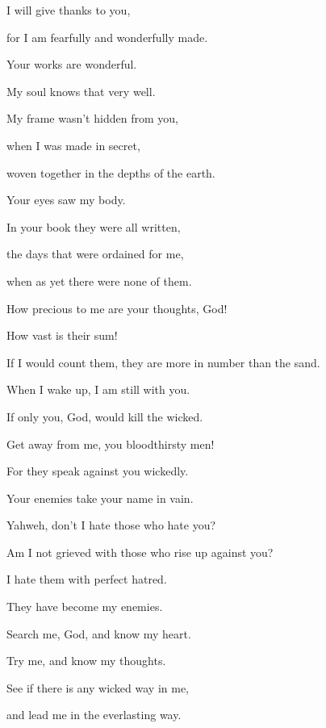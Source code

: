 {\par }{\Q {}I will give thanks to you,
\par }{\QB for I am fearfully and wonderfully made.
\par }{\Q Your works are wonderful.
\par }{\QB My soul knows that very well.
\par }{\Q {}My frame wasn’t hidden from you,
\par }{\QB when I was made in secret,
\par }{\QB woven together in the depths of the earth.
\par }{\Q {}Your eyes saw my body.
\par }{\QB In your book they were all written,
\par }{\QB the days that were ordained for me,
\par }{\QB when as yet there were none of them.
\par }{\Q {}How precious to me are your thoughts, God!
\par }{\QB How vast is their sum!
\par }{\Q {}If I would count them, they are more in number than the sand.
\par }{\QB When I wake up, I am still with you.
\par }{\Q {}If only you, God, would kill the wicked.
\par }{\QB Get away from me, you bloodthirsty men!
\par }{\Q {}For they speak against you wickedly.
\par }{\QB Your enemies take your name in vain.
\par }{\Q {}Yahweh, don’t I hate those who hate you?
\par }{\QB Am I not grieved with those who rise up against you?
\par }{\Q {}I hate them with perfect hatred.
\par }{\QB They have become my enemies.
\par }{\Q {}Search me, God, and know my heart.
\par }{\QB Try me, and know my thoughts.
\par }{\Q {}See if there is any wicked way in me,
\par }{\QB and lead me in the everlasting way.

\par }
